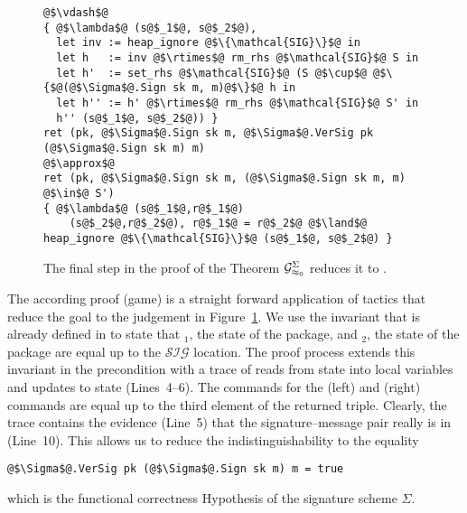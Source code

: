 %
\begin{figure}
\begin{center}
\begin{minipage}{0.9\columnwidth}
\begin{verbatim}
@$\vdash$@
{ @$\lambda$@ (s@$_1$@, s@$_2$@),
  let inv := heap_ignore @$\{\mathcal{SIG}\}$@ in
  let h   := inv @$\rtimes$@ rm_rhs @$\mathcal{SIG}$@ S in
  let h'  := set_rhs @$\mathcal{SIG}$@ (S @$\cup$@ @$\{$@(@$\Sigma$@.Sign sk m, m)@$\}$@ h in
  let h'' := h' @$\rtimes$@ rm_rhs @$\mathcal{SIG}$@ S' in
  h'' (s@$_1$@, s@$_2$@)) }
ret (pk, @$\Sigma$@.Sign sk m, @$\Sigma$@.VerSig pk (@$\Sigma$@.Sign sk m) m)
@$\approx$@
ret (pk, @$\Sigma$@.Sign sk m, (@$\Sigma$@.Sign sk m, m) @$\in$@ S')
{ @$\lambda$@ (s@$_1$@,r@$_1$@)
    (s@$_2$@,r@$_2$@), r@$_1$@ = r@$_2$@ @$\land$@ heap_ignore @$\{\mathcal{SIG}\}$@ (s@$_1$@, s@$_2$@) }
\end{verbatim}
\end{minipage}
\end{center}

\caption{
  The final step in the proof of the Theorem $\mathcal{G}_{\text{\ensuremath{\approx_0}}}^{\Sigma}$ reduces it to .
}
\label{fig:ind:proof}
\end{figure}
%
%
\begin{IEEEproof}
The according proof (game) is a straight forward application of
\ssprove tactics that reduce the goal to the judgement in Figure~\ref{fig:ind:proof}.
%
We use the  invariant that is already defined in
\ssprove to state that
$_1$, the state of the \real package, and
$_2$, the state of the \ideal package are equal up to
the $\mathcal{SIG}$ location.
%
The proof process extends this invariant in the precondition
with a trace of reads from state into local variables and
updates to state (Lines~4--6).
%
The commands for the \real (left) and \ideal (right) commands
are equal up to the third element of the returned triple.
%
Clearly, the trace contains the evidence (Line~5) that the
signature--message pair really is in  (Line~10).
%
This allows us to reduce the indistinguishability to the equality
%
\begin{verbatim}
@$\Sigma$@.VerSig pk (@$\Sigma$@.Sign sk m) m = true
\end{verbatim}
%
which is the functional correctness Hypothesis 
of the signature scheme $\Sigma$.
%
\end{IEEEproof}



